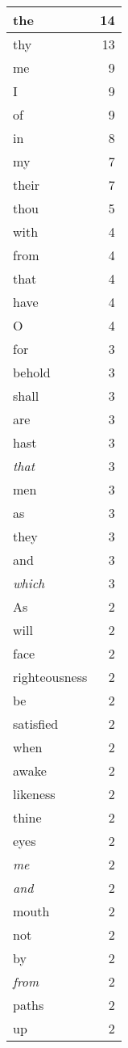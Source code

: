 \begin{center}
\begin{longtable}{l|r}
\hline \hline
\endlastfoot
the & 14 \\ \hline
thy & 13 \\ \hline
me & 9 \\ \hline
I & 9 \\ \hline
of & 9 \\ \hline
in & 8 \\ \hline
my & 7 \\ \hline
their & 7 \\ \hline
thou & 5 \\ \hline
with & 4 \\ \hline
from & 4 \\ \hline
that & 4 \\ \hline
have & 4 \\ \hline
O & 4 \\ \hline
for & 3 \\ \hline
behold & 3 \\ \hline
shall & 3 \\ \hline
are & 3 \\ \hline
hast & 3 \\ \hline
\emph{that} & 3 \\ \hline
men & 3 \\ \hline
as & 3 \\ \hline
they & 3 \\ \hline
and & 3 \\ \hline
\emph{which} & 3 \\ \hline
As & 2 \\ \hline
will & 2 \\ \hline
face & 2 \\ \hline
righteousness & 2 \\ \hline
be & 2 \\ \hline
satisfied & 2 \\ \hline
when & 2 \\ \hline
awake & 2 \\ \hline
likeness & 2 \\ \hline
thine & 2 \\ \hline
eyes & 2 \\ \hline
\emph{me} & 2 \\ \hline
\emph{and} & 2 \\ \hline
mouth & 2 \\ \hline
not & 2 \\ \hline
by & 2 \\ \hline
\emph{from} & 2 \\ \hline
paths & 2 \\ \hline
up & 2 \\ \hline

\end{longtable}
\end{center}
